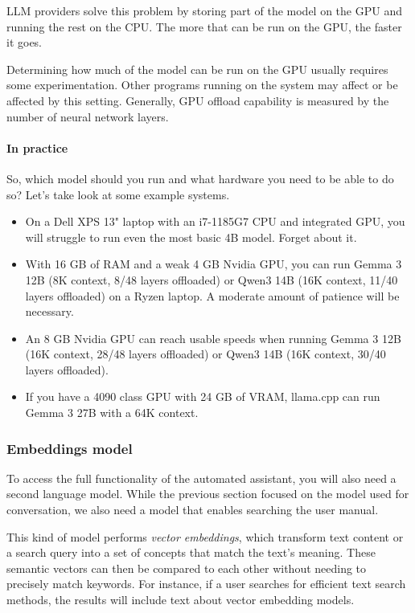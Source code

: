 \documentclass[hidelinks,titlepage,a4paper,twoside]{article}
\begin{document}
LLM providers solve this problem by storing part of the model on the GPU and running the rest on the CPU. The more that can be run on the GPU, the faster it goes.

Determining how much of the model can be run on the GPU usually requires some experimentation. Other programs running on the system may affect or be affected by this setting. Generally, GPU offload capability is measured by the number of neural network layers.

\paragraph{In practice}

So, which model should you run and what hardware you need to be able to do so? Let's take look at some example systems.

\begin{itemize}
\item On a Dell XPS 13" laptop with an i7-1185G7 CPU and integrated GPU, you will struggle to run even the most basic 4B model. Forget about it.
\item With 16 GB of RAM and a weak 4 GB Nvidia GPU, you can run Gemma 3 12B (8K context, 8/48 layers offloaded) or Qwen3 14B (16K context, 11/40 layers offloaded) on a Ryzen laptop. A moderate amount of patience will be necessary.
\item An 8 GB Nvidia GPU can reach usable speeds when running Gemma 3 12B (16K context, 28/48 layers offloaded) or Qwen3 14B (16K context, 30/40 layers offloaded).
\item If you have a 4090 class GPU with 24 GB of VRAM, llama.cpp can run Gemma 3 27B with a 64K context.
\end{itemize}

\subsubsection{Embeddings model}

To access the full functionality of the automated assistant, you will also need a second language model. While the previous section focused on the model used for conversation, we also need a model that enables searching the user manual.

This kind of model performs \emph{vector embeddings}, which transform text content or a search query into a set of concepts that match the text's meaning. These semantic vectors can then be compared to each other without needing to precisely match keywords. For instance, if a user searches for efficient text search methods, the results will include text about vector embedding models.
\end{document}
